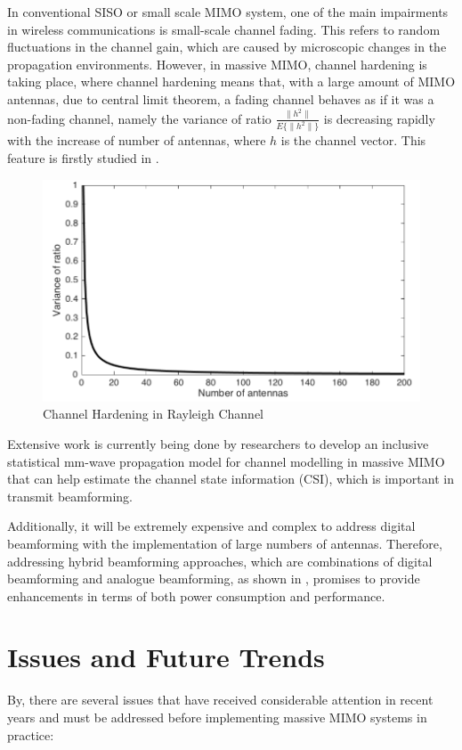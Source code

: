 \documentclass{article}
\begin{document}
In conventional SISO or small scale MIMO system, one of the main impairments in wireless communications is small-scale channel fading. This refers to random fluctuations in the channel gain, which are caused by microscopic changes in the propagation environments. However, in massive MIMO, channel hardening is taking place, where channel hardening means that, with a large amount of MIMO antennas, due to central limit theorem, a fading channel behaves as if it was a non-fading channel, namely the variance of ratio $ \frac{\|h^2\|}{E\{\|h^2\|\}} $ is decreasing rapidly with the increase of number of antennas, where $h$ is the channel vector. This feature is firstly studied in \cite{ChannelHarden}.

\begin{figure}[h!]
\centering
\includegraphics[scale=0.4]{channelharden.png}
\caption{Channel Hardening in Rayleigh Channel}
\label{fig:channelharden}
\end{figure}

Extensive work is currently being done by researchers to develop an inclusive statistical mm-wave propagation model for channel modelling in massive MIMO that can help estimate the channel state information (CSI), which is important in transmit beamforming.

Additionally, it will be extremely expensive and complex to address digital beamforming with the implementation of large numbers of antennas. Therefore, addressing hybrid beamforming approaches, which are combinations of digital beamforming and analogue beamforming, as shown in \cite{mmWaveandMIMO}, promises to provide enhancements in terms of both power consumption and performance.

\section{Issues and Future Trends }
By\cite{BeamformingFuture},
there are several issues that
have received considerable attention in recent years
and must be addressed before implementing massive
MIMO systems in practice:
\end{document}
